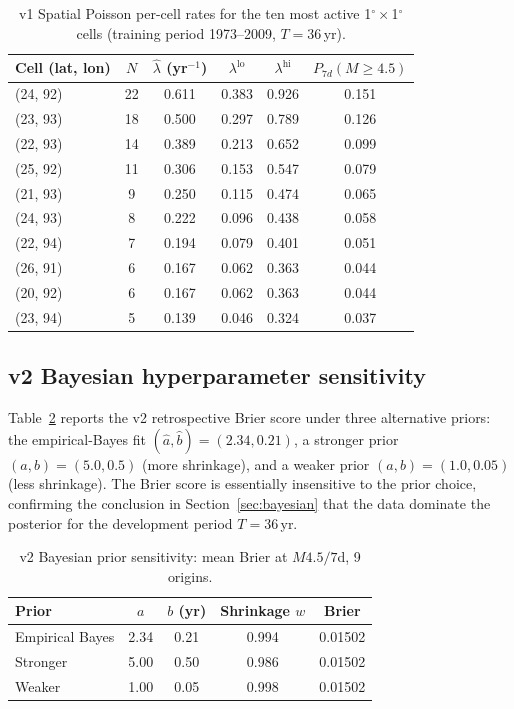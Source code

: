 \documentclass[10pt,a4paper,twocolumn]{article}
\begin{document}
\begin{table}[t]
\centering
\caption{v1 Spatial Poisson per-cell rates for the ten most active 1$^\circ\times$1$^\circ$ cells (training period 1973--2009, $T=36$\,yr).}\label{tab:v1-cell-rates}
\small
\begin{tabular*}{\columnwidth}{@{\extracolsep{\fill}}lccccc}
\toprule
Cell (lat, lon) & $N$ & $\hat\lambda$ (yr$^{-1}$) & $\lambda^{\text{lo}}$ & $\lambda^{\text{hi}}$ & $P_{7d}(M\geq4.5)$ \\
\midrule
(24, 92) & 22 & 0.611 & 0.383 & 0.926 & 0.151 \\
(23, 93) & 18 & 0.500 & 0.297 & 0.789 & 0.126 \\
(22, 93) & 14 & 0.389 & 0.213 & 0.652 & 0.099 \\
(25, 92) & 11 & 0.306 & 0.153 & 0.547 & 0.079 \\
(21, 93) & 9  & 0.250 & 0.115 & 0.474 & 0.065 \\
(24, 93) & 8  & 0.222 & 0.096 & 0.438 & 0.058 \\
(22, 94) & 7  & 0.194 & 0.079 & 0.401 & 0.051 \\
(26, 91) & 6  & 0.167 & 0.062 & 0.363 & 0.044 \\
(20, 92) & 6  & 0.167 & 0.062 & 0.363 & 0.044 \\
(23, 94) & 5  & 0.139 & 0.046 & 0.324 & 0.037 \\
\bottomrule
\end{tabular*}
\end{table}

\subsection{v2 Bayesian hyperparameter sensitivity}

Table~\ref{tab:v2-prior-sensitivity} reports the v2 retrospective Brier score under three alternative priors: the empirical-Bayes fit $(\hat a, \hat b) = (2.34, 0.21)$, a stronger prior $(a, b) = (5.0, 0.5)$ (more shrinkage), and a weaker prior $(a, b) = (1.0, 0.05)$ (less shrinkage). The Brier score is essentially insensitive to the prior choice, confirming the conclusion in Section~\ref{sec:bayesian} that the data dominate the posterior for the development period $T=36$\,yr.

\begin{table}[t]
\centering
\caption{v2 Bayesian prior sensitivity: mean Brier at $M4.5/7$d, 9 origins.}\label{tab:v2-prior-sensitivity}
\small
\begin{tabular*}{\columnwidth}{@{\extracolsep{\fill}}lcccc}
\toprule
Prior & $a$ & $b$ (yr) & Shrinkage $w$ & Brier \\
\midrule
Empirical Bayes & 2.34 & 0.21 & 0.994 & 0.01502 \\
Stronger        & 5.00 & 0.50 & 0.986 & 0.01502 \\
Weaker          & 1.00 & 0.05 & 0.998 & 0.01502 \\
\bottomrule
\end{tabular*}
\end{table}
\end{document}
